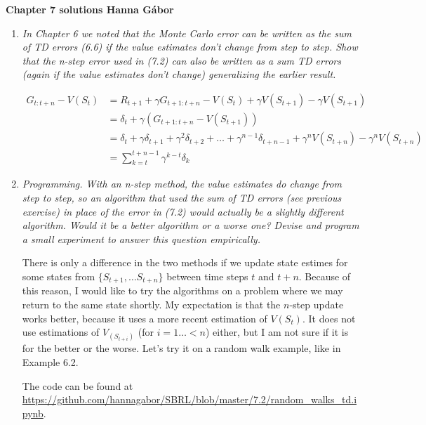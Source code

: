 \documentclass[12pt,a4paper]{article}
\begin{document}
\textbf{Chapter 7 solutions  \hfill Hanna Gábor}

\begin{enumerate}
  \item
    \textit{In Chapter 6 we noted that the Monte Carlo error can be written as the
    sum of TD errors (6.6) if the value estimates don’t change from step to step. Show that
    the n-step error used in (7.2) can also be written as a sum TD errors (again if the value
    estimates don’t change) generalizing the earlier result.}

    \begin{align*}
      G_{t: t + n} - V(S_t) & = R_{t + 1} + \gamma G_{t + 1: t + n} - V(S_t) + \gamma V(S_{t + 1}) - \gamma V(S_{t + 1})\\
      & = \delta_t + \gamma(G_{t + 1: t + n} - V(S_{t + 1})) \\
      & = \delta_t + \gamma \delta_{t + 1} + \gamma^2 \delta_{t + 2} + \dots + \gamma^{n - 1} \delta_{t + n - 1} + \gamma^{n}V(S_{t + n}) - \gamma^n V(S_{t + n}) \\
      & = \sum\limits_{k = t}^{t + n - 1} \gamma^{k - t} \delta_k
    \end{align*}

  \item
    \textit{Programming. With an n-step method, the value estimates do change from
    step to step, so an algorithm that used the sum of TD errors (see previous exercise) in
    place of the error in (7.2) would actually be a slightly different algorithm. Would it be a
    better algorithm or a worse one? Devise and program a small experiment to answer this
    question empirically.}

    There is only a difference in the two methods if we update state estimes for some states from
    $\{S_{t + 1}, \dots S_{t + n}\}$ between time steps $t$ and $t + n$. Because of this reason,
    I would like to try the algorithms on a problem where we may return to the same
    state shortly. My expectation is that the $n$-step update works better, because it uses
    a more recent estimation of $V(S_t)$. It does not use estimations of $V_(S_{t + i})$
    (for $i = 1 \dots < n$) either, but I am not sure if it is for the better or the worse. Let's try it on a random walk example, like in Example 6.2.

    The code can be found at \url{https://github.com/hannagabor/SBRL/blob/master/7.2/random_walks_td.ipynb}.


\end{enumerate}
\end{document}
